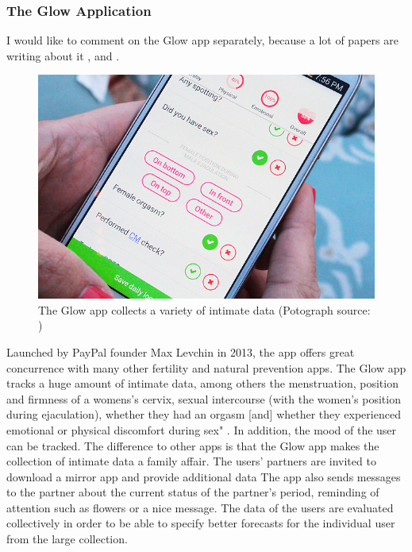 \subsubsection{The Glow Application}
\label{subsubsec:glow_application}
I would like to comment on the Glow app separately, because a lot of papers are writing about it \cite{doi:10.1080/15265161.2017.1409823}, \cite{levy2014intimate} and \cite{doi:10.1080/13691058.2014.920528}.
\begin{figure}[htb]
	\centering
	\includegraphics[width=\linewidth]{img/Glow-App-review-screenshot-1.jpg}
	\caption{The Glow app collects a variety of intimate data (Potograph source: \cite{glowApp})}
	\label{fig:glow_app}
\end{figure}
Launched by PayPal founder Max Levchin in 2013, the app offers great concurrence with many other fertility and natural prevention apps. The Glow app tracks a huge amount of intimate data, among others the menstruation, position and firmness of a womens's cervix, sexual intercourse (with the women's position during ejaculation), whether they had an orgasm [and] whether they experienced emotional or physical discomfort during sex" \cite{doi:10.1080/13691058.2014.920528}. In addition, the mood of the user can be tracked.
The difference to other apps is that the Glow app makes the collection of intimate data a family affair. The users' partners are invited to download a mirror app and provide additional data \cite{levy2014intimate} The app also sends messages to the partner about the current status of the partner's period, reminding of attention such as flowers or a nice message.
The data of the users are evaluated collectively in order to be able to specify better forecasts for the individual user from the large collection.

